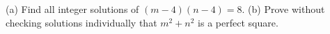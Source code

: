 (a) Find all integer solutions of $(m-4)(n-4)=8$. (b) Prove without checking solutions individually that $m^2+n^2$ is a perfect square.
